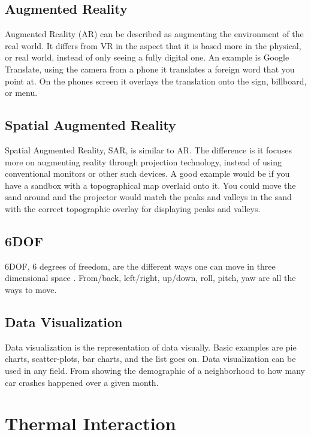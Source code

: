 \documentclass{sig-alternate}
\begin{document}
\subsection{Augmented Reality}
\label{sec:Augmented Reality}
Augmented Reality (AR) can be described as augmenting the environment of the real world. It differs from VR in the aspect that it is based more in the physical, or real world, instead of only seeing a fully digital one. An example is Google Translate, using the camera from a phone it translates a foreign word that you point at. On the phones screen it overlays the translation onto the sign, billboard, or menu. 


\subsection{Spatial Augmented Reality}
\label{sec:Spatial Augmented Reality}
Spatial Augmented Reality, SAR, is similar to AR. The difference is it focuses more on augmenting reality through projection technology, instead of using conventional monitors or other such devices. A good example would be if you have a sandbox with a topographical map overlaid onto it. You could move the sand around and the projector would match the peaks and valleys in the sand with the correct topographic overlay for displaying peaks and valleys.  

\subsection{6DOF}
\label{sec:6DOF}
6DOF, 6 degrees of freedom, are the different ways one can move in three dimensional space . From/back, left/right, up/down, roll, pitch, yaw are all the ways to move.
 

\subsection{Data Visualization}
\label{sec:Data Visualization}
Data visualization is the representation of data visually. Basic examples are pie charts, scatter-plots, bar charts, and the list goes on. Data visualization can be used in any field. From showing the demographic of a neighborhood to how many car crashes happened over a given month.   

\section{Thermal Interaction}
\label{sec:Thermal Interaction}
\end{document}

